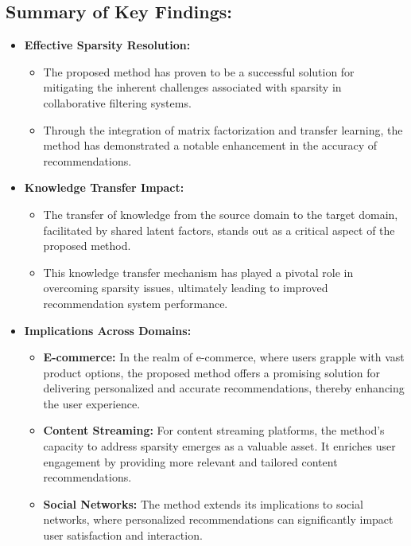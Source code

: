 \documentclass{article}
\begin{document}
\subsection{Summary of Key Findings:}
\begin{itemize}
  \item \textbf{Effective Sparsity Resolution:}
    \begin{itemize}
      \item The proposed method has proven to be a successful solution for mitigating the inherent challenges associated with sparsity in collaborative filtering systems.
      \item Through the integration of matrix factorization and transfer learning, the method has demonstrated a notable enhancement in the accuracy of recommendations.
    \end{itemize}
  
  \item \textbf{Knowledge Transfer Impact:}
    \begin{itemize}
      \item The transfer of knowledge from the source domain to the target domain, facilitated by shared latent factors, stands out as a critical aspect of the proposed method.
      \item This knowledge transfer mechanism has played a pivotal role in overcoming sparsity issues, ultimately leading to improved recommendation system performance.
    \end{itemize}
  
  \item \textbf{Implications Across Domains:}
    \begin{itemize}
      \item \textbf{E-commerce:} In the realm of e-commerce, where users grapple with vast product options, the proposed method offers a promising solution for delivering personalized and accurate recommendations, thereby enhancing the user experience.
      \item \textbf{Content Streaming:} For content streaming platforms, the method's capacity to address sparsity emerges as a valuable asset. It enriches user engagement by providing more relevant and tailored content recommendations.
      \item \textbf{Social Networks:} The method extends its implications to social networks, where personalized recommendations can significantly impact user satisfaction and interaction.
    \end{itemize}
\end{itemize}
\end{document}
